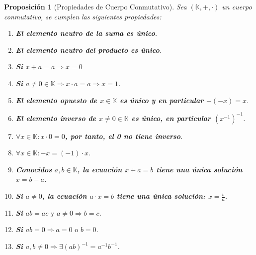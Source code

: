 \documentclass[10pt,a4paper,openright]{book}
\theoremstyle{break}
\newtheorem*{prop}{Proposición}
\begin{document}
\begin{prop}[Propiedades de Cuerpo Conmutativo]
Sea $(\mathbb K, +, \cdot)$ un cuerpo conmutativo, se cumplen las siguientes propiedades:
\begin{enumerate}
\item \textbf{El elemento neutro de la suma es único}.
\item \textbf{El elemento neutro del producto es único}. 
\item \textbf{Si $x+a=a\Rightarrow x=0$}\par 
\item \textbf{Si $a\neq 0\in \mathbb K \Rightarrow x\cdot a=a\Rightarrow x=1$}.
\item \textbf{El elemento opuesto de $x\in \mathbb K$ es único y en particular $-(-x)=x$}.
\item \textbf{El elemento inverso de $x\neq 0\in \mathbb K$ es único, en particular $(x^{-1})^{-1}$}.
\item \textbf{$\forall x\in \mathbb K: x\cdot 0=0$, por tanto, el 0 no tiene inverso}. 
\item \textbf{$\forall x\in \mathbb K : -x=(-1)\cdot x$}.
\item \textbf{Conocidos $a, b\in \mathbb{K}$, la ecuación $x+a=b$ tiene una única solución $x=b-a$}.
\item \textbf{Si $a\neq 0$, la ecuación $a\cdot x=b$ tiene una única solución: $x=\frac{b}{a}$}.
\item \textbf{Si $ab=ac \mbox{ y } a\neq 0 \Rightarrow b=c$}. 
\item \textbf{Si $ab=0\Rightarrow a=0 \mbox{ o } b=0$}.
\item \textbf{Si $a, b \neq 0 \Rightarrow \exists (ab)^{-1} = a^{-1}b^{-1}$}.
\end{enumerate}
\end{prop}
\end{document}
